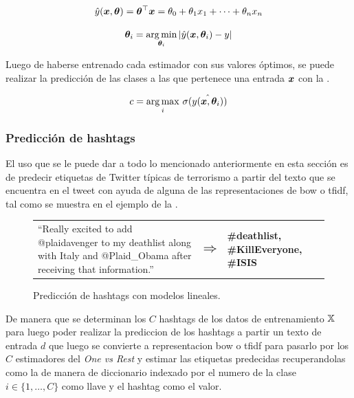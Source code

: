 \begin{equation} \label{eq:linear-regression-training}
  \hat{y}({\bm{x}}, {\bm{\theta}}) = {\bm{\theta}}^{\top} {\bm{x}} = \theta_0 + \theta_1 x_1 + \cdots + \theta_n x_n
\end{equation}

\begin{equation} \label{eq:linear-regression-estimation}
  {\bm{\theta}}_i = \operatorname*{arg\,min}_{{\bm{\theta}}_i} | \hat{y}({\bm{x}}, {\bm{\theta}}_i) - y|
\end{equation}

Luego de haberse entrenado cada estimador con sus valores óptimos, se puede realizar la predicción de las clases a las que pertenece una entrada ${\bm{x}}$ con la .

\begin{equation} \label{eq:ovr-prediction}
  c = \operatorname*{arg\,max}_i \, \sigma(\hat{y({\bm{x}}, {\bm{\theta}}_i)})
\end{equation}

\subsubsection{Predicción de hashtags}
El uso que se le puede dar a todo lo mencionado anteriormente en esta sección es de predecir etiquetas de Twitter típicas de terrorismo a partir del texto que se encuentra en el tweet con ayuda de alguna de las representaciones de \gls{bow} o \gls{tfidf}, tal como se muestra en el ejemplo de la .

\begin{figure}[H]
  \centering
  \begin{tabular}{p{} p{} p{}}
    ``Really excited to add @plaidavenger to my deathlist along with Italy and @Plaid\_Obama after receiving that information.'' & $\mathlarger{\mathlarger{\mathlarger{\Rightarrow}}}$ & \textbf{\#deathlist, \#KillEveryone, \#ISIS}
  \end{tabular}
  \decoRule
  \caption{Predicción de hashtags con modelos lineales.}
  \label{fig:tweet-prediction}
\end{figure}

De manera que se determinan los $C$ hashtags de los datos de entrenamiento ${\mathbb{X}}$ para luego poder realizar la prediccion de los hashtags a partir un texto de entrada $d$ que luego se convierte a representacion \gls{bow} o \gls{tfidf} para pasarlo por los $C$ estimadores del \emph{One vs Rest} y estimar las etiquetas predecidas recuperandolas como la  de manera de diccionario indexado por el numero de la clase $i \in \{1, \ldots, C\}$ como llave y el hashtag como el valor.

